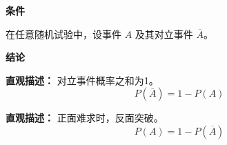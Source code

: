 \begin{statementbox}
	\textbf{\textcolor{CStatement}{条件}}
	\begin{description}[style=nextline, leftmargin=2.8em, labelsep=0.5em, itemsep=0.35em]
		\item[\textbf{\textcolor{CStatement}{条件1（随机试验）：}}] 在任意随机试验中，设事件 $A$ 及其对立事件 $\overline{A}$。
	\end{description}

	\textbf{\textcolor{CStatement}{结论}}
	\begin{description}[style=nextline, leftmargin=2.8em, labelsep=0.5em, itemsep=0.45em]
		\item[\textbf{\textcolor{CStatement}{结论一（概率公式）：}}]
			\textbf{\textcolor{CStatement}{直观描述：}}
			对立事件概率之和为1。
			\[
				\boxed{P(\overline{A}) = 1 - P(A)}
			\]
		\item[\textbf{\textcolor{CStatement}{推广结论（常见变形）：}}]
			\textbf{\textcolor{CStatement}{直观描述：}}
			正面难求时，反面突破。
			\[
				P(A) = 1 - P(\overline{A})
			\]
	\end{description}
\end{statementbox}
